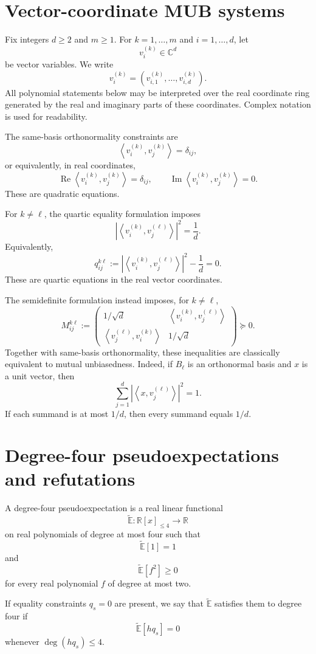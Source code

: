 \documentclass[11pt]{article}
\theoremstyle{remark}
\newcommand{\C}{\mathbb{C}}
\newcommand{\R}{\mathbb{R}}
\newcommand{\Et}{\widetilde{\mathbb{E}}}
\newcommand{\ip}[2]{\left\langle #1,#2\right\rangle}
\begin{document}
\section{Vector-coordinate MUB systems}

Fix integers $d\ge2$ and $m\ge1$. For $k=1,\ldots,m$ and $i=1,\ldots,d$, let
\[
v_i^{(k)}\in\C^d
\]
be vector variables. We write
\[
v_i^{(k)}=(v_{i,1}^{(k)},\ldots,v_{i,d}^{(k)}).
\]
All polynomial statements below may be interpreted over the real coordinate ring generated by the real and imaginary parts of these coordinates. Complex notation is used for readability.

The same-basis orthonormality constraints are
\[
\ip{v_i^{(k)}}{v_j^{(k)}}=\delta_{ij},
\]
or equivalently, in real coordinates,
\[
\operatorname{Re}\ip{v_i^{(k)}}{v_j^{(k)}}=\delta_{ij},
\qquad
\operatorname{Im}\ip{v_i^{(k)}}{v_j^{(k)}}=0.
\]
These are quadratic equations.

For $k\ne \ell$, the quartic equality formulation imposes
\[
|\ip{v_i^{(k)}}{v_j^{(\ell)}}|^2=\frac1d.
\]
Equivalently,
\[
q_{ij}^{k\ell}:=
|\ip{v_i^{(k)}}{v_j^{(\ell)}}|^2-\frac1d=0.
\]
These are quartic equations in the real vector coordinates.

The semidefinite formulation instead imposes, for $k\ne\ell$,
\[
M_{ij}^{k\ell}:=
\begin{pmatrix}
1/\sqrt d & \ip{v_i^{(k)}}{v_j^{(\ell)}}\\
\ip{v_j^{(\ell)}}{v_i^{(k)}} & 1/\sqrt d
\end{pmatrix}
\succeq0.
\]
Together with same-basis orthonormality, these inequalities are classically equivalent to mutual unbiasedness. Indeed, if $B_\ell$ is an orthonormal basis and $x$ is a unit vector, then
\[
\sum_{j=1}^d |\ip{x}{v_j^{(\ell)}}|^2=1.
\]
If each summand is at most $1/d$, then every summand equals $1/d$.

\section{Degree-four pseudoexpectations and refutations}

A degree-four pseudoexpectation is a real linear functional
\[
\Et:\R[x]_{\le4}\to\R
\]
on real polynomials of degree at most four such that
\[
\Et[1]=1
\]
and
\[
\Et[f^2]\ge0
\]
for every real polynomial $f$ of degree at most two.

If equality constraints $q_s=0$ are present, we say that $\Et$ satisfies them to degree four if
\[
\Et[hq_s]=0
\]
whenever $\deg(hq_s)\le4$.
\end{document}
